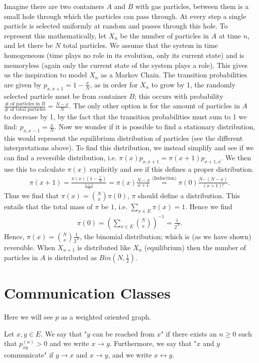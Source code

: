 \begin{ex}
	Imagine there are two containers $A$ and $B$ with gas particles, between them is a small hole through which the particles can pass through. At every step a single particle is selected uniformly at random and passes through this hole. To represent this mathematically, let $X_n$ be the number of particles in $A$ at time $n$, and let there be $N$ total particles. We assume that the system in time homogeneous (time plays no role in its evolution, only its current state) and is memoryless (again only the current state of the system plays a role). This gives us the inspiration to model $X_n$ as a Markov Chain. The transition probabilities are given by $p_{x, x+1}= 1- \frac{x}{N}$, as in order for $X_n$ to grow by 1, the randomly selected particle must be from container $B $; this occurs with probability $\frac{\# \textrm{ of particles in }B}{\# \textrm{ of total particles}} = \frac{N-x}{N}$. The only other option is for the amount of particles in $A$ to decrease by 1, by the fact that the transition probabilities must sum to 1 we find: $p_{x, x-1}= \frac{x}{N}$. Now we wonder if it is possible to find a stationary distribution, this would represent the equilibrium distribution of particles (see the different interpretations above). To find this distribution, we instead simplify and see if we can find a reversible distribution, i.e. $\pi (x) p_{x,x+1} = \pi (x+1)p_{x+1, x}$. We then use this to calculate $\pi (x)$ explicitly and see if this defines a proper distribution. 
	\begin{align}
		\pi (x+1) = \frac{\pi (x)(1 - \frac{x}{N})}{\frac{x+1}{N}} = \pi (x) \frac{N-x}{x+1} \stackrel{\textrm{(Induction)}}{=} \pi (0) \frac{N  \cdots (N-x)}{(x+1)!} 
	.\end{align}	
	Thus we find that $\pi (x) = \binom{N}{x}\pi(0)$, $\pi$ should define a distribution. This entails that the total mass of $\pi $ be $1$, i.e. $\sum_{x \in E}^{} \pi (x)=1$. Hence we find 
\begin{align}
\pi (0) = \left( \sum_{x \in E}^{} \binom{N}{x} \right)^{-1} = \frac{1}{2^N} 
.\end{align}
Hence, $\pi (x)= \binom{N}{x} \frac{1}{2^N}$, the binomial distribution; which is (as we have shown) reversible. When $X_{n+1}$ is distributed like $X_n$ (equilibrium) then the number of particles in $A$ is distributed as $Bin(N, \frac{1}{2})$.
\end{ex}


\section{Communication Classes}
Here we will see $p$ as a weighted oriented graph.
\begin{defn}
	Let $x,y \in E$. We say that "$y$ can be reached from $ x$" if there exists an $n \geq 0$ such that  $p_{xy}^{(n)}>0$ and we write $x \to y$. Furthermore, we say that "$x$ and $y $ communicate"  if $y  \rightarrow x$ and $x  \rightarrow y$, and  we write $x  \leftrightarrow y$.
\end{defn}

